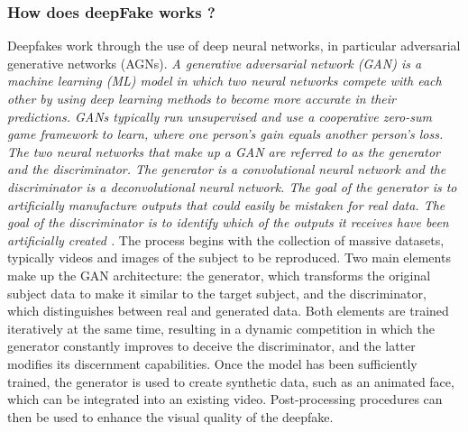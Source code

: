 \subsubsection{How does deepFake works ?}
Deepfakes work through the use of deep neural networks, in particular adversarial generative networks (AGNs). \emph{A generative adversarial network (GAN) is a machine learning (ML) model in which two neural networks compete with each other by using deep learning methods to become more accurate in their predictions. GANs typically run unsupervised and use a cooperative zero-sum game framework to learn, where one person's gain equals another person's loss.
The two neural networks that make up a GAN are referred to as the generator and the discriminator. The generator is a convolutional neural network and the discriminator is a deconvolutional neural network. The goal of the generator is to artificially manufacture outputs that could easily be mistaken for real data. The goal of the discriminator is to identify which of the outputs it receives have been artificially created \cite{WhatGenerativeAdversarial}.}
The process begins with the collection of massive datasets, typically videos and images of the subject to be reproduced. Two main elements make up the GAN architecture: the generator, which transforms the original subject data to make it similar to the target subject, and the discriminator, which distinguishes between real and generated data. Both elements are trained iteratively at the same time, resulting in a dynamic competition in which the generator constantly improves to deceive the discriminator, and the latter modifies its discernment capabilities. Once the model has been sufficiently trained, the generator is used to create synthetic data, such as an animated face, which can be integrated into an existing video. Post-processing procedures can then be used to enhance the visual quality of the deepfake.

